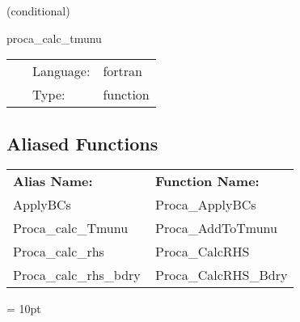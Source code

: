 \vspace{5mm}

   (conditional) 

\hspace{5mm} proca\_calc\_tmunu 

\hspace{5mm}{\it compute the energy-momentum tensor } 


\hspace{5mm}

 \begin{tabular*}{160mm}{cll} 
~ & Language:  & fortran \\ 
~ & Type:  & function \\ 
\end{tabular*} 


\subsection*{Aliased Functions}

\hspace{5mm}

 \begin{tabular*}{160mm}{ll} 

{\bf Alias Name:} ~~~~~~~ & {\bf Function Name:} \\ 
ApplyBCs & Proca\_ApplyBCs \\ 
Proca\_calc\_Tmunu & Proca\_AddToTmunu \\ 
Proca\_calc\_rhs & Proca\_CalcRHS \\ 
Proca\_calc\_rhs\_bdry & Proca\_CalcRHS\_Bdry \\ 
\end{tabular*} 



\vspace{5mm}\parskip = 10pt 
